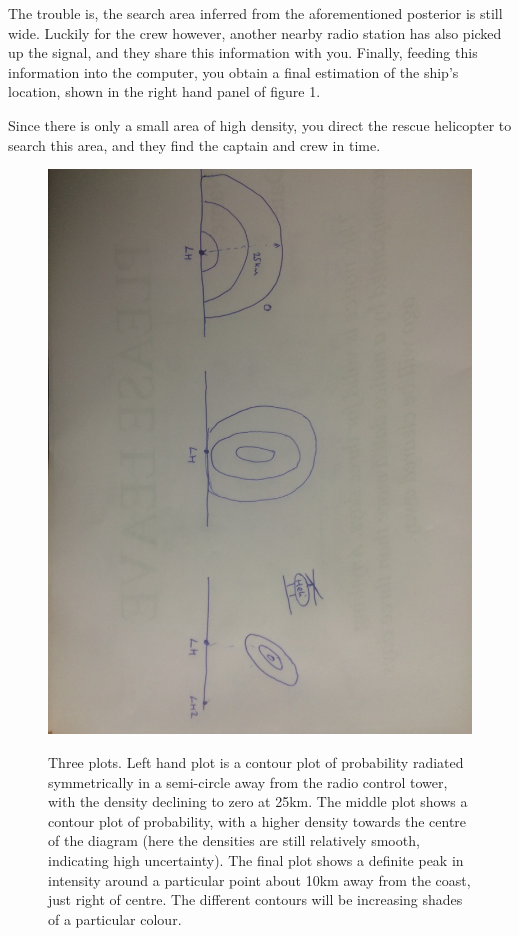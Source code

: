 \documentclass[11pt,fullpage]{book}
\begin{document}
The trouble is, the search area inferred from the aforementioned posterior is still wide. Luckily for the crew however, another nearby radio station has also picked up the signal, and they share this information with you. Finally, feeding this information into the computer, you obtain a final estimation of the ship's location, shown in the right hand panel of figure 1. 

Since there is only a small area of high density, you direct the rescue helicopter to search this area, and they find the captain and crew in time.

\begin{figure}
\centering
\scalebox{0.2} 
{\includegraphics{Posterior_bayesianLighthouse.jpg}}
\caption{Three plots. Left hand plot is a contour plot of probability radiated symmetrically in a semi-circle away from the radio control tower, with the density declining to zero at 25km. The middle plot shows a contour plot of probability, with a higher density towards the centre of the diagram (here the densities are still relatively smooth, indicating high uncertainty). The final plot shows a definite peak in intensity around a particular point about 10km away from the coast, just right of centre. The different contours will be increasing shades of a particular colour.}\label{fig:Posterior_bayesianLighthouse}
\end{figure}
\end{document}
